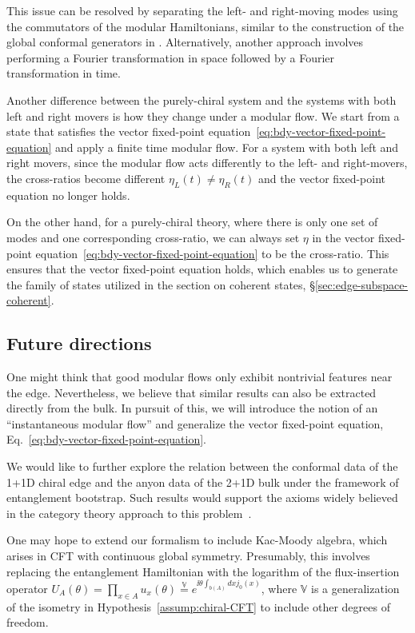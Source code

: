 \documentclass[12pt, nofootinbib]{article}
\theoremstyle{plain}
\theoremstyle{assumption}
\theoremstyle{definition}
\theoremstyle{plain}
\theoremstyle{plain}
\theoremstyle{plain}
\theoremstyle{plain}
\theoremstyle{plain}
\def\veq{\stackrel{\mathbb{V}}{=}}
\begin{document}
This issue can be resolved by separating the left- and right-moving modes using the commutators of the modular Hamiltonians, similar to the construction of the global conformal generators in \cite{Lin2023}. Alternatively, another approach involves performing a Fourier transformation in space followed by a Fourier transformation in time.

Another difference between the purely-chiral system and the systems with both left and right movers is how they change under a modular flow.
We start from a state that satisfies the vector fixed-point equation~\eqref{eq:bdy-vector-fixed-point-equation} and apply a finite time modular flow.
For a system with both left and right movers, since the modular flow acts differently to the left- and right-movers, the cross-ratios become different $\eta_L (t) \ne \eta_R(t)$ and the vector fixed-point equation no longer holds.

On the other hand, for a purely-chiral theory, where there is only one set of modes and one corresponding cross-ratio, we can always set $\eta$ in the vector fixed-point equation~\eqref{eq:bdy-vector-fixed-point-equation} to be the cross-ratio. 
This ensures that the vector fixed-point equation holds, which enables us to generate the family of states utilized in the section on coherent states, \S\ref{sec:edge-subspace-coherent}.

\subsection{Future directions}

One might think that good modular flows only exhibit nontrivial features near the edge. Nevertheless, we believe that similar results can also be extracted directly from the bulk. In pursuit of this, we will introduce the notion of an ``instantaneous modular flow'' and generalize the vector fixed-point equation, Eq.~\eqref{eq:bdy-vector-fixed-point-equation}.

We would like to further explore the relation between the conformal data of the 1+1D chiral edge and the anyon data of the 2+1D bulk under the framework of entanglement bootstrap. Such results would support the axioms widely believed in the category theory approach to this problem~\cite{2018NuPhB.927..140K, Kong:2019byq, Kong:2019cuu}. 


One may hope to extend our formalism to include Kac-Moody algebra, which arises in CFT with continuous global symmetry.
Presumably, this involves replacing the entanglement Hamiltonian with the logarithm of the flux-insertion operator $U_A(\theta) = \prod_{x \in A } u_x(\theta) \veq e^{ \ii \theta \int_{b(A)} dx j_0(x) } $, where $\mathbb{V}$ is a generalization of the isometry in Hypothesis~\ref{assump:chiral-CFT} to include other degrees of freedom.  
\end{document}
